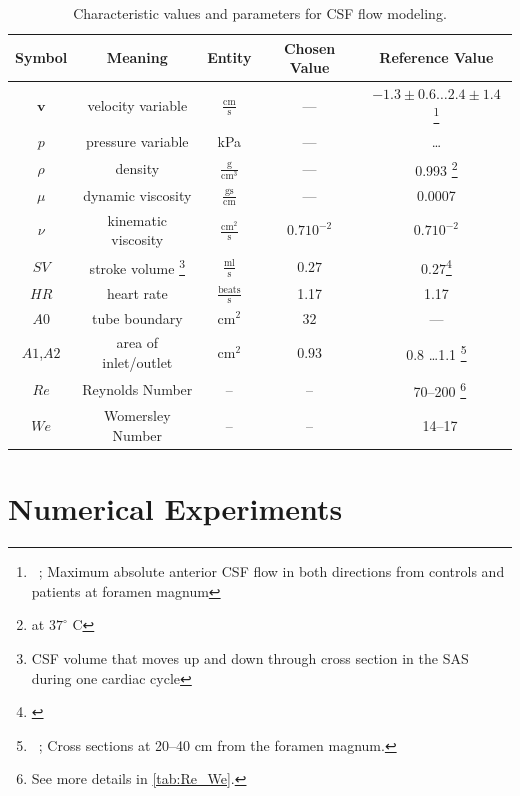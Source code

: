\begin{table}\begin{minipage}{\textwidth}\begin{center}
    \begin{tabular}{ | c | c | c | c | c | }
    \hline
    Symbol & Meaning & Entity & Chosen Value & Reference Value\\ \hline\hline
	$\mathbf{v}$	& velocity variable & $\mathrm{ \frac{cm}{s}}$ & --- & $-1.3\pm 0.6 \ldots 2.4 \pm 1.4$ \footnote{~\cite{Hofmann2000}; Maximum absolute anterior CSF flow in both directions from controls and patients at foramen magnum} \\
	$p$		& pressure	variable & kPa & --- & \ldots\\
	$\rho$	& density & $\mathrm{\frac{g}{cm^3}}$ & --- &0.993 \footnote{at $37^\circ$ C }\\ %
	$\mu$	& dynamic viscosity	&  $\mathrm{\frac{g s}{cm}}$ & --- & 0.0007\\
	$\nu$	& kinematic viscosity & $\mathrm{ \frac{cm^2}{s}}$ & $0.7 10^{-2}$ & $0.7 10^{-2}$ \\ 	\hline %
	$SV$	& stroke volume \footnote{CSF volume that moves up and down through cross section in the SAS during one cardiac cycle}	& $\mathrm{ \frac{ml}{s}}$& $0.27$  & $0.27$\footnote{\cite{Gupta2009}} \\
	$HR$	& heart rate & $\mathrm{\frac{beats}{s}}$	& 1.17 & 1.17\\
	$A0$	& tube boundary	& $\mathrm{ cm^2}$ & $32$  & ---\\
	$A1$,$A2$	& area of inlet/outlet & $\mathrm{ cm^2}$ &$0.93$ & 0.8 \ldots 1.1 \footnote{~\cite{Loth2001}; Cross sections at 20--40 cm from the foramen magnum.}  \\
    \hline
    $Re$    & Reynolds Number & -- & -- & ~70--200 \footnote{See more details in \ref{tab:Re_We}.}\\
    $We$    & Womersley Number & -- & -- & ~14--17 \\
    \hline
    \end{tabular}
	\label{tab:entities}
	\caption{Characteristic values and parameters for CSF flow modeling.}
\end{center}\end{minipage}\end{table}

\section{Numerical Experiments}

